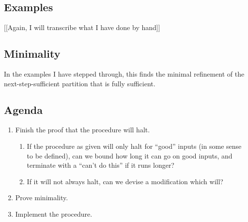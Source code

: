 \documentclass[../new-procedure.tex]{subfiles}
\begin{document}
\subsection{Examples}

[[Again, I will transcribe what I have done by hand]]

\subsection{Minimality}

In the examples I have stepped through, this finds the minimal refinement
of the next-step-sufficient partition that is fully sufficient. 

\subsection{Agenda}

\begin{enumerate}
\item Finish the proof that the procedure will halt.
  \begin{enumerate}
  \item If the procedure as given will only halt for ``good'' inputs (in some
    sense to be defined), can we bound how long it can go on good inputs, and
    terminate with a ``can't do this'' if it runs longer?
  \item If it will not always halt, can we devise a modification which will?
  \end{enumerate}
\item Prove minimality.
\item Implement the procedure.
\end{enumerate}
\end{document}
